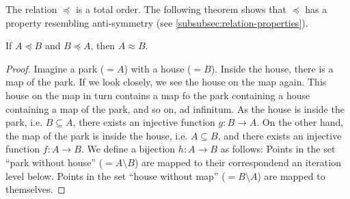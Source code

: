 


The relation \(\preccurlyeq\) is a total order.
The following theorem shows that \(\preccurlyeq\) has a property resembling anti-symmetry (see \ref{subsubsec:relation-properties}).

\begin{theorem}\label{thm:csb}
If \(A\preccurlyeq B\) and \(B\preccurlyeq A\), then \(A\approx B\).
\end{theorem}

\begin{proof}
Imagine a park (\(=A\)) with a house (\(=B\)).
Inside the house, there is a map of the park.
If we look closely, we see the house on the map again.
This house on the map in turn contains a map fo the park containing a house containing a map of the park, and so on, ad infinitum.
As the house is inside the park, i.e. \(B\subseteq A\), there exists an injective function \(g : B \to A\).
On the other hand, the map of the park is inside the house, i.e. \(A\subseteq B\), and there exists an injective function \(f : A \to B\).
We define a bijection \(h\colon A\to B\) as follows: Points in the set ``park without house'' (\(=A\setminus B\)) are mapped to their correspondend an iteration level below.
Points in the set ``house without map'' (\(=B\setminus A\)) are mapped to themselves.
\end{proof}

